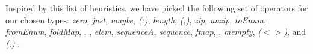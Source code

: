 \documentclass{article}
\begin{document}
Inspired by this list of heuristics,
we have picked the following set of operators for our chosen types:
\emph{zero}, %
\emph{just}, %
\emph{maybe}, %
\emph{(:)}, %
\emph{length}, %
\emph{(,)}, %
\emph{zip}, %
\emph{unzip}, %
\emph{toEnum}, %
\emph{fromEnum}, %
\emph{foldMap}, %
, %
, %
\emph{elem}, %
\emph{sequenceA}, %
\emph{sequence}, %
\emph{fmap}, %
, %
\emph{mempty}, %
\emph{($<>$)}, %
and \emph{(.)}%
. %
\end{document}
